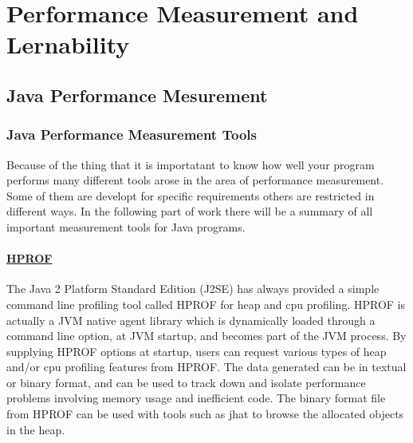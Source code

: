 \chapter{Performance Measurement and Lernability}
\label{chap:p_measurement}



\section{Java Performance Mesurement}
\label{perf_measure}


\subsection{Java Performance Measurement Tools}

Because of the thing that it is importatant to know how well your program performs many different tools arose 
in the area of performance measurement. Some of them are developt for specific requirements others are restricted in different ways. In the following part of work there will be a summary of all important measurement tools for Java programs.


\subsubsection{\href{https://profiler.netbeans.org/}{HPROF}}

The Java 2 Platform Standard Edition (J2SE) has always provided a simple command line profiling tool called HPROF for heap and cpu profiling. HPROF is actually a JVM native agent library which is dynamically loaded through a command line option, at JVM startup, and becomes part of the JVM process. By supplying HPROF options at startup, users can request various types of heap and/or cpu profiling features from HPROF. The data generated can be in textual or binary format, and can be used to track down and isolate performance problems involving memory usage and inefficient code. The binary format file from HPROF can be used with tools such as jhat to browse the allocated objects in the heap.

